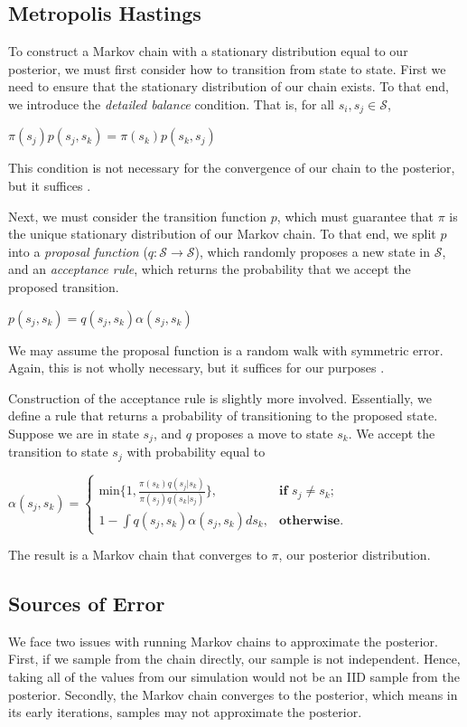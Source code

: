 \documentclass[12pt,twoside]{reedthesis}
\begin{document}
		\subsection*{Metropolis Hastings}
			To construct a Markov chain with a stationary distribution equal to our posterior, we must first consider how to transition from state to state. 
			First we need to ensure that the stationary distribution of our chain exists. 
			To that end, we introduce the {\em detailed balance} condition. That is, for all $s_i, s_j \in \mathcal S$,
			\begin{center}
			$ \pi(s_j) p(s_j,s_k) = \pi(s_k) p(s_k,s_j) $
			\end{center}
			This condition is not necessary for the convergence of our chain to the posterior, but it suffices \cite{mcmc}.
			
			Next, we must consider the transition function $p$, which must guarantee that $\pi$ is the unique stationary distribution of our Markov chain. 
			To that end, we split $p$ into a {\em proposal function} ($q: \mathcal S \rightarrow \mathcal S$), which randomly proposes a new state in $\mathcal S$, and an {\em acceptance rule}, which returns the probability that we accept the proposed transition.
			\begin{center}
			$
			p(s_j,s_k) = q(s_j,s_k) \alpha(s_j,s_k)
			$
			\end{center}
			We may assume the proposal function is a random walk with symmetric error.
			Again, this is not wholly necessary, but it suffices for our purposes \cite{mcmc}.
			
			Construction of the acceptance rule is slightly more involved. 
			Essentially, we define a rule that returns a probability of transitioning to the proposed state.
			Suppose we are in state $s_j$, and $q$ proposes a move to state $s_k$. 
			We accept the transition to state $s_j$ with probability equal to
			\begin{center}
			$ \alpha(s_j,s_k) = 
			\begin{cases} \textrm{min}\{1, \frac{\pi(s_k)q(s_j | s_k)}{\pi(s_j)q(s_k | s_j)}\}, & \textbf{if\ \ \ } s_j \neq s_k; \\
			1 - \int q(s_j,s_k)\alpha(s_j,s_k)ds_k, & \textbf{otherwise}. \end{cases}
			$
			\end{center}
			The result is a Markov chain that converges to $\pi$, our posterior distribution.
			
		\subsection*{Sources of Error}
			We face two issues with running Markov chains to approximate the posterior. First, if we sample from the chain directly, our sample is not independent. Hence, taking all of the values from our simulation would not be an IID sample from the posterior. Secondly, the Markov chain converges to the posterior, which means in its early iterations, samples may not approximate the posterior. 
			
\end{document}
